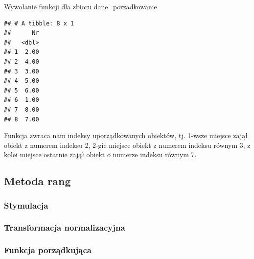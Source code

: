 \documentclass[12pt,a4paper]{report}
\begin{document}
{Wywołanie funkcji dla zbioru dane\_porzadkowanie 

\begin{Shaded}
\begin{Highlighting}[]
\end{Highlighting}
\end{Shaded}

\begin{verbatim}
## # A tibble: 8 x 1
##      Nr
##   <dbl>
## 1  2.00
## 2  4.00
## 3  3.00
## 4  5.00
## 5  6.00
## 6  1.00
## 7  8.00
## 8  7.00
\end{verbatim}

Funkcja zwraca nam indeksy uporządkowanych obiektów, tj. 1-wsze miejsce
zajął obiekt z numerem indeksu 2, 2-gie miejsce obiekt z numerem indeksu
równym 3, z kolei miejsce ostatnie zajął obiekt o numerze indeksu równym
7.

\subsection{Metoda rang}
\subsubsection{Stymulacja} 
\begin{Shaded}
\begin{Highlighting}[]
\NormalTok{)} 
\end{Highlighting}
\end{Shaded}


\subsubsection{Transformacja normalizacyjna}
\begin{Shaded}
\begin{Highlighting}[]
\end{Highlighting}
\end{Shaded}

\subsubsection{Funkcja porządkująca}\label{funkcja-porzadkujaca-metoda-rang}

}
\end{document}
